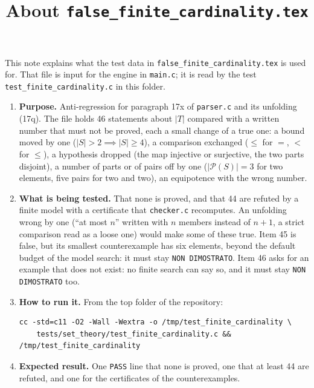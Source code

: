 \documentclass[11pt,a4paper]{article}
\title{About \texttt{false\_finite\_cardinality.tex}}
\author{}
\date{}
\begin{document}
\maketitle
This note explains what the test data in \texttt{false\_finite\_cardinality.tex} is used for. That file is input for the engine in \texttt{main.c}; it is read by the test \texttt{test\_finite\_cardinality.c} in this folder.

\begin{enumerate}
\item \textbf{Purpose.} Anti-regression for paragraph 17x of \texttt{parser.c} and its unfolding (17q). The file holds 46 statements about $|T|$ compared with a written number that must not be proved, each a small change of a true one: a bound moved by one ($|S| > 2 \implies |S| \ge 4$), a comparison exchanged ($\le$ for $=$, $<$ for $\le$), a hypothesis dropped (the map injective or surjective, the two parts disjoint), a number of parts or of pairs off by one ($|\mathcal{P}(S)| = 3$ for two elements, five pairs for two and two), an equipotence with the wrong number.

\item \textbf{What is being tested.} That none is proved, and that 44 are refuted by a finite model with a certificate that \texttt{checker.c} recomputes. An unfolding wrong by one (``at most $n$'' written with $n$ members instead of $n + 1$, a strict comparison read as a loose one) would make some of these true. Item 45 is false, but its smallest counterexample has six elements, beyond the default budget of the model search: it must stay \texttt{NON DIMOSTRATO}. Item 46 asks for an example that does not exist: no finite search can say so, and it must stay \texttt{NON DIMOSTRATO} too.

\item \textbf{How to run it.} From the top folder of the repository:
\begin{verbatim}
cc -std=c11 -O2 -Wall -Wextra -o /tmp/test_finite_cardinality \
    tests/set_theory/test_finite_cardinality.c && /tmp/test_finite_cardinality
\end{verbatim}

\item \textbf{Expected result.} One \texttt{PASS} line that none is proved, one that at least 44 are refuted, and one for the certificates of the counterexamples.
\end{enumerate}
\end{document}
